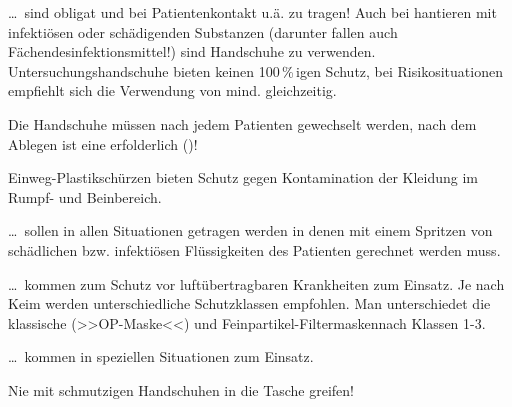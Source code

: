 {

}{

}{}{}{}




{

\begin{compactdesc}
  \item [Untersuchungshandschuhe] \ldots\ sind obligat und  bei
  Patientenkontakt u.ä. zu tragen! Auch bei hantieren mit infektiösen
  oder schädigenden Substanzen (darunter fallen auch
  Fächendesinfektionsmittel!) sind Handschuhe zu verwenden.
  Untersuchungshandschuhe bieten keinen 100\,\%\,igen Schutz, bei
  Risikosituationen empfiehlt sich die Verwendung von mind. 
  gleichzeitig. 
  
  Die Handschuhe müssen nach jedem Patienten gewechselt werden, nach dem
  Ablegen ist eine  erfolderlich ()!
  \item [Schürzen] Einweg-Plastikschürzen bieten Schutz gegen Kontamination der
  Kleidung im Rumpf- und Beinbereich. 
  \item [Schutzbrillen] \ldots\ sollen in allen Situationen getragen werden in
  denen mit einem Spritzen von schädlichen bzw. infektiösen Flüssigkeiten des
  Patienten gerechnet werden muss. 
  \item [Atemmasken] \ldots\ kommen zum Schutz vor luftübertragbaren
  Krankheiten zum Einsatz. Je nach Keim werden unterschiedliche Schutzklassen
  empfohlen. Man unterschiedet die klassische 
  (>>OP-Maske<<) und Feinpartikel-Filtermaskennach  Klassen 1-3.
  \item [Schutzanzüge] \ldots\ kommen in speziellen Situationen zum
  Einsatz.
\end{compactdesc}

}{

}{}{}{}


{
Nie mit schmutzigen Handschuhen in die Tasche greifen!

}{

}{}{}{}


